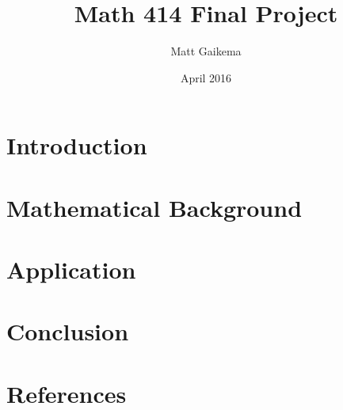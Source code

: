 \documentclass{article}
\title{Math 414 Final Project}
\author{Matt Gaikema}
\date{April 2016}
\begin{document}
\maketitle

\section{Introduction}

\section{Mathematical Background}

\section{Application}

\section{Conclusion}

\section{References}
\end{document}
